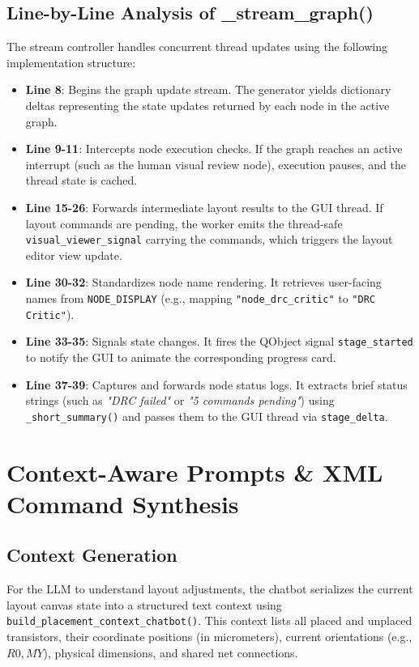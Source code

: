 \subsection{Line-by-Line Analysis of \_stream\_graph()}
The stream controller handles concurrent thread updates using the following implementation structure:
\begin{itemize}
    \item \textbf{Line 8}: Begins the graph update stream. The generator yields dictionary deltas representing the state updates returned by each node in the active graph.
    \item \textbf{Line 9-11}: Intercepts node execution checks. If the graph reaches an active interrupt (such as the human visual review node), execution pauses, and the thread state is cached.
    \item \textbf{Line 15-26}: Forwards intermediate layout results to the GUI thread. If layout commands are pending, the worker emits the thread-safe \texttt{visual\_viewer\_signal} carrying the commands, which triggers the layout editor view update.
    \item \textbf{Line 30-32}: Standardizes node name rendering. It retrieves user-facing names from \texttt{NODE\_DISPLAY} (e.g., mapping \texttt{"node\_drc\_critic"} to \texttt{"DRC Critic"}).
    \item \textbf{Line 33-35}: Signals state changes. It fires the QObject signal \texttt{stage\_started} to notify the GUI to animate the corresponding progress card.
    \item \textbf{Line 37-39}: Captures and forwards node status logs. It extracts brief status strings (such as \emph{"DRC failed"} or \emph{"5 commands pending"}) using \texttt{\_short\_}\allowbreak\texttt{summary()} and passes them to the GUI thread via \texttt{stage\_}\allowbreak\texttt{delta}.
\end{itemize}

\section[Context Prompts \& XML Synthesis]{Context-Aware Prompts \& XML Command Synthesis}
\label{sec:context_prompts}

\subsection{Context Generation}
For the LLM to understand layout adjustments, the chatbot serializes the current layout canvas state into a structured text context using \texttt{build\_}\allowbreak\texttt{placement\_}\allowbreak\texttt{context\_}\allowbreak\texttt{chatbot()}. This context lists all placed and unplaced transistors, their coordinate positions (in micrometers), current orientations (e.g., $R0, MY$), physical dimensions, and shared net connections.

